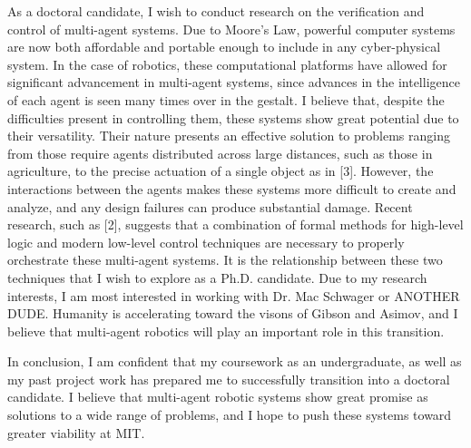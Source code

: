 \documentclass[]{article}
\begin{document}
As a doctoral candidate, I wish to conduct research on the verification and control of multi-agent systems. Due to Moore’s Law, powerful computer systems are now both affordable and portable enough to include in any cyber-physical system. In the case of robotics, these computational platforms have allowed for significant advancement in multi-agent systems, since advances in the intelligence of each agent is seen many times over in the gestalt. I believe that, despite the difficulties present in controlling them, these systems show great potential due to their versatility. Their nature presents an effective solution to problems ranging from those require agents distributed across large distances, such as those in agriculture, to the precise actuation of a single object as in [3]. However, the interactions between the agents makes these systems more difficult to create and analyze, and any design failures can produce substantial damage. Recent research, such as [2], suggests that a combination of formal methods for high-level logic and modern low-level control techniques are necessary to properly orchestrate these multi-agent systems. It is the relationship between these two techniques that I wish to explore as a Ph.D. candidate. Due to my research interests, I am most interested in working with Dr. Mac Schwager or ANOTHER DUDE. Humanity is accelerating toward the visons of Gibson and Asimov, and I believe that multi-agent robotics will play an important role in this transition.

In conclusion, I am confident that my coursework as an undergraduate, as well as my past project work has prepared me to successfully transition into a doctoral candidate. I believe that multi-agent robotic systems show great promise as solutions to a wide range of problems, and I hope to push these systems toward greater viability at MIT.
\end{document}

